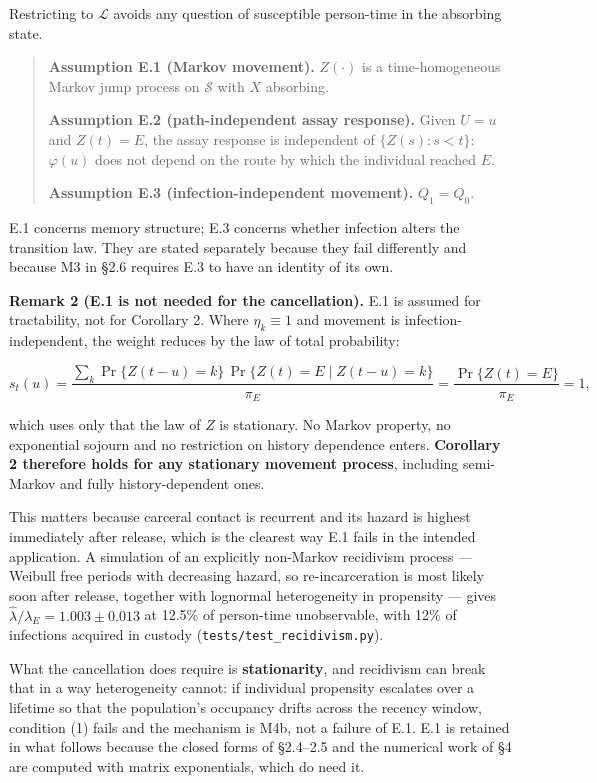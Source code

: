 Restricting to \(\mathcal{L}\) avoids any question of susceptible person-time in the absorbing state.

\begin{quote}
\textbf{Assumption E.1 (Markov movement).} \(Z(\cdot)\) is a time-homogeneous Markov jump process on \(\mathcal{S}\) with \(X\) absorbing.

\textbf{Assumption E.2 (path-independent assay response).} Given \(U=u\) and \(Z(t)=E\), the assay response is independent of \(\{Z(s):s<t\}\): \(\varphi(u)\) does not depend on the route by which the individual reached \(E\).

\textbf{Assumption E.3 (infection-independent movement).} \(Q_1=Q_0\).
\end{quote}

E.1 concerns memory structure; E.3 concerns whether infection alters the transition law. They are stated separately because they fail differently and because M3 in §2.6 requires E.3 to have an identity of its own.

\textbf{Remark 2 (E.1 is not needed for the cancellation).} E.1 is assumed for tractability, not for Corollary 2. Where \(\eta_k\equiv1\) and movement is infection-independent, the weight reduces by the law of total probability:

\[
s_t(u)=\frac{\sum_k \Pr\{Z(t-u)=k\}\,\Pr\{Z(t)=E\mid Z(t-u)=k\}}{\pi_E}
=\frac{\Pr\{Z(t)=E\}}{\pi_E}=1,
\]

which uses only that the law of \(Z\) is stationary. No Markov property, no exponential sojourn and no restriction on history dependence enters. \textbf{Corollary 2 therefore holds for any stationary movement process}, including semi-Markov and fully history-dependent ones.

This matters because carceral contact is recurrent and its hazard is highest immediately after release, which is the clearest way E.1 fails in the intended application. A simulation of an explicitly non-Markov recidivism process --- Weibull free periods with decreasing hazard, so re-incarceration is most likely soon after release, together with lognormal heterogeneity in propensity --- gives \(\hat\lambda/\lambda_E = 1.003 \pm 0.013\) at 12.5\% of person-time unobservable, with 12\% of infections acquired in custody (\texttt{tests/test\_recidivism.py}).

What the cancellation does require is \textbf{stationarity}, and recidivism can break that in a way heterogeneity cannot: if individual propensity escalates over a lifetime so that the population's occupancy drifts across the recency window, condition (1) fails and the mechanism is M4b, not a failure of E.1. E.1 is retained in what follows because the closed forms of §2.4--2.5 and the numerical work of §4 are computed with matrix exponentials, which do need it.

